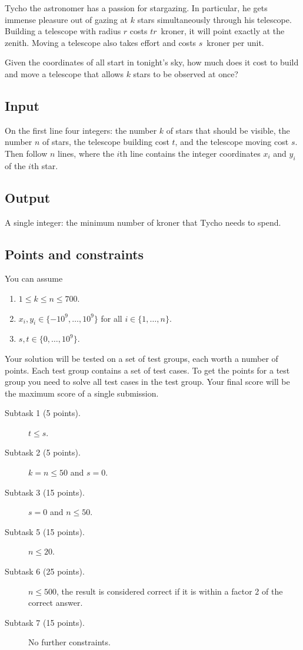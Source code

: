 
Tycho the astronomer has a passion for stargazing.
In particular, he gets immense pleasure out of gazing at $k$ stars simultaneously through his telescope.   
Building a telescope with radius $r$ costs $tr$~kroner, it will point exactly at the zenith.
Moving a telescope also takes effort and costs $s$~kroner per unit.

Given the coordinates of all start in tonight's sky, how much does it cost to build and move a telescope that allows $k$ stars to be observed at once?

\subsection*{Input}

On the first line four integers: the number $k$ of stars that should be visible, the number $n$ of stars, the telescope building cost $t$, and the telescope moving cost $s$.
Then follow $n$ lines, where the $i$th line contains the integer coordinates $x_i$ and $y_i$ of the $i$th star.

\subsection*{Output}

A single integer: the minimum number of kroner that Tycho needs to spend.

\subsection*{Points and constraints}

You can assume 
\begin{enumerate}
\item $1\leq k\leq n\leq 700$.
\item $x_i, y_i\in \{-10^9,\ldots, 10^9\}$ for all $i\in\{1,\ldots,n\}$.
\item $s, t\in \{0,\ldots, 10^9\}$.
\end{enumerate}

Your solution will be tested on a set of test groups, each worth a number of points.
Each test group contains a set of test cases.
To get the points for a test group you need to solve all test cases in the test group.
Your final score will be the maximum score of a single submission.

\begin{description}
\item[Subtask 1 (5 points).] $t\leq s$.
\item[Subtask 2 (5 points).] $k=n\le 50$ and $s=0$.
\item[Subtask 3 (15 points).] $s=0$ and $n\le50$.
\item[Subtask 5 (15 points).] $n\leq 20$.
\item[Subtask 6 (25 points).] $n\leq 500$, the result is considered correct if it is within a factor 2 of the correct answer.
\item[Subtask 7 (15 points).] No further constraints.
\end{description}
